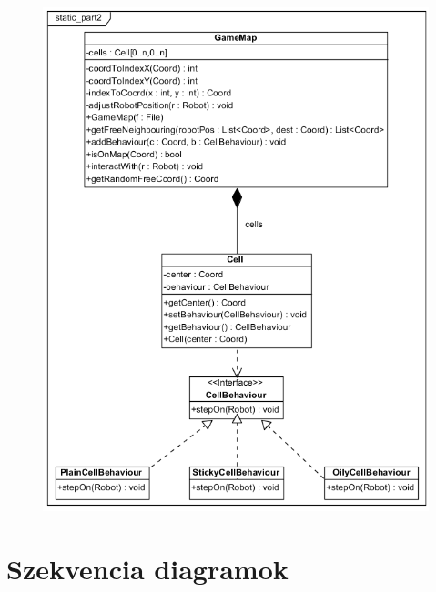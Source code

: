 \begin{figure}[!htbp]
	\begin{center}
		\includegraphics[width=180mm, center]{./chapters/chapter03/static2.png}
		\caption{}
	\end{center}
\end{figure}

\clearpage

\section{Szekvencia diagramok}

